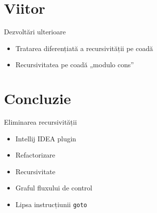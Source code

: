 \documentclass{beamer}
\def\code#1{\texttt{#1}}
\begin{document}
\section{Viitor}

\begin{frame}{Dezvoltări ulterioare}
	\begin{itemize}
		\item Tratarea diferențiată a recursivității pe coadă
		\item Recursivitatea pe coadă „modulo cons”
	\end{itemize}
\end{frame}

\section{Concluzie}

\begin{frame}{Eliminarea recursivității}
\begin{itemize}
    \item Intellij IDEA plugin
    \item Refactorizare
    \item Recursivitate
    \item Graful fluxului de control
    \item Lipsa instrucțiunii \code{goto}
\end{itemize}
\end{frame}
\end{document}
